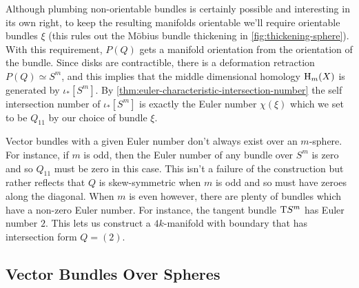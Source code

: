 Although plumbing non-orientable bundles is certainly possible and interesting in its own right, to keep the resulting manifolds orientable we'll require orientable bundles $\xi$ (this rules out the M\"obius bundle thickening in \cref{fig:thickening-sphere}). With this requirement, $P(Q)$ gets a manifold orientation from the orientation of the bundle.
Since disks are contractible, there is a deformation retraction $P(Q)\simeq S^m$, and this implies that the middle dimensional homology $\operatorname{H}_m(X)$ is generated by $\iota_*[S^m]$. By \cref{thm:euler-characteristic-intersection-number} the self intersection number of $\iota_*[S^m]$ is exactly the Euler number $\chi(\xi)$ which we set to be $Q_{11}$ by our choice of bundle $\xi$.

Vector bundles with a given Euler number don't always exist over an $m$-sphere. For instance, if $m$ is odd, then the Euler number of any bundle over $S^m$ is zero and so $Q_{11}$ must be zero in this case. This isn't a failure of the construction but rather reflects that $Q$ is skew-symmetric when $m$ is odd and so must have zeroes along the diagonal. When $m$ is even however, there are plenty of bundles which have a non-zero Euler number. For instance, the tangent bundle $\mathrm{T} S^m$ has Euler number $2$. This lets us construct a $4k$-manifold with boundary that has intersection form $Q = (2)$.

\subsection*{Vector Bundles Over Spheres}

